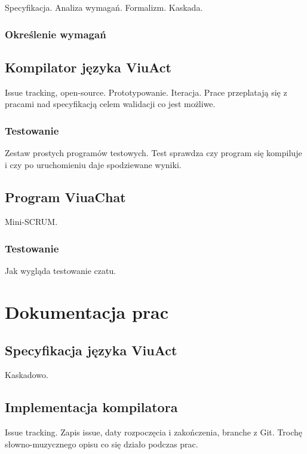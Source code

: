 \documentclass[11pt,oneside,a4paper,titlepage,onecolumn]{book}
\begin{document}
Specyfikacja. Analiza wymagań. Formalizm. Kaskada.

\subsection{Określenie wymagań}

\section{Kompilator języka ViuAct}

Issue tracking, open-source. Prototypowanie. Iteracja.
Prace przeplatają się z pracami nad specyfikacją celem walidacji co jest możliwe.

\subsection{Testowanie}

Zestaw prostych programów testowych. Test sprawdza czy program się kompiluje i czy po uruchomieniu daje
spodziewane wyniki.

\section{Program ViuaChat}

Mini-SCRUM.

\subsection{Testowanie}

Jak wygląda testowanie czatu.

\chapter{Dokumentacja prac}

\section{Specyfikacja języka ViuAct}

Kaskadowo.

\section{Implementacja kompilatora}

Issue tracking. Zapis issue, daty rozpoczęcia i zakończenia, branche z Git. Trochę słowno-muzycznego opisu co
się działo podczas prac.
\end{document}
